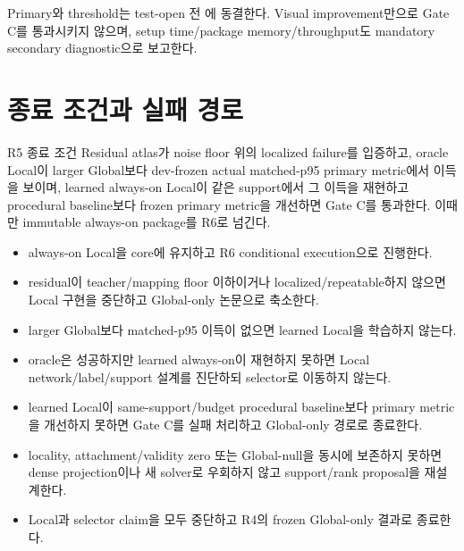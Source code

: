 \documentclass[10pt,a4paper]{article}
\begin{document}
Primary와 threshold는 test-open 전 에 동결한다. Visual improvement만으로
Gate C를 통과시키지 않으며, setup time/package memory/throughput도 mandatory secondary diagnostic으로 보고한다.

\section{종료 조건과 실패 경로}
\label{sec:r5-chapter-8}

\begin{contractbox}{R5 종료 조건}
Residual atlas가 noise floor 위의 localized failure를 입증하고, oracle Local이 larger Global보다
dev-frozen actual matched-p95 primary metric에서 이득을 보이며, learned always-on Local이 같은 support에서 그 이득을 재현하고
procedural baseline보다 frozen primary metric을 개선하면 Gate C를 통과한다.
이때만 immutable always-on package를 R6로 넘긴다.
\end{contractbox}

\begin{itemize}
  \item {} always-on Local을 core에 유지하고 R6 conditional execution으로 진행한다.
  \item {} residual이 teacher/mapping floor 이하이거나 localized/repeatable하지 않으면
  Local 구현을 중단하고 Global-only 논문으로 축소한다.
  \item {} larger Global보다 matched-p95 이득이 없으면 learned Local을 학습하지 않는다.
  \item {} oracle은 성공하지만 learned always-on이 재현하지 못하면
  Local network/label/support 설계를 진단하되 selector로 이동하지 않는다.
  \item {} learned Local이 same-support/budget procedural baseline보다
  primary metric을 개선하지 못하면 Gate C를 실패 처리하고 Global-only 경로로 종료한다.
  \item {} locality, attachment/validity zero 또는 Global-null을 동시에 보존하지 못하면
  dense projection이나 새 solver로 우회하지 않고 support/rank proposal을 재설계한다.
  \item {} Local과 selector claim을 모두 중단하고 R4의 frozen Global-only 결과로 종료한다.
\end{itemize}
\end{document}
